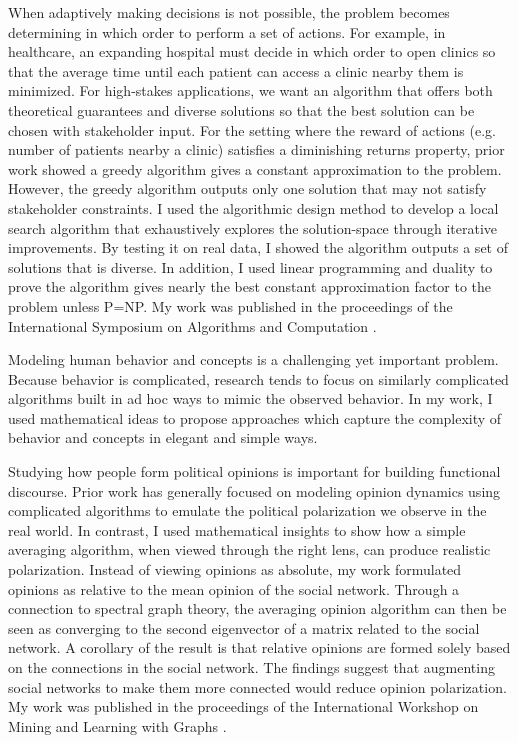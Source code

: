 \documentclass[11pt]{article}
\begin{document}
When adaptively making decisions is not possible, the problem becomes determining in which order to perform a set of actions.
For example, in healthcare, an expanding hospital must decide in which order to open clinics so that the average time until each patient can access a clinic nearby them is minimized.
For high-stakes applications, we want an algorithm that offers both theoretical guarantees and diverse solutions so that the best solution can be chosen with stakeholder input.
For the setting where the reward of actions (e.g. number of patients nearby a clinic) satisfies a diminishing returns property, prior work showed a greedy algorithm gives a constant approximation to the problem.
However, the greedy algorithm outputs only one solution that may not satisfy stakeholder constraints.
I used the algorithmic design method to develop a local search algorithm that exhaustively explores the solution-space through iterative improvements.
By testing it on real data, I showed the algorithm outputs a set of solutions that is diverse.
In addition, I used linear programming and duality to prove the algorithm gives nearly the best constant approximation factor to the problem unless P=NP.
My work was published in the proceedings of the International Symposium on Algorithms and Computation \cite{hellerstein2022local}.


\noindent Modeling human behavior and concepts is a challenging yet important problem.
Because behavior is complicated, research tends to focus on similarly complicated algorithms built in ad hoc ways to mimic the observed behavior.
In my work, I used mathematical ideas to propose approaches which capture the complexity of behavior and concepts in elegant and simple ways.

Studying how people form political opinions is important for building functional discourse.
Prior work has generally focused on modeling opinion dynamics using complicated algorithms to emulate the political polarization we observe in the real world.
In contrast, I used mathematical insights to show how a simple averaging algorithm, when viewed through the right lens, can produce realistic polarization.
Instead of viewing opinions as absolute, my work formulated opinions as relative to the mean opinion of the social network.
Through a connection to spectral graph theory, the averaging opinion algorithm can then be seen as converging to the second eigenvector of a matrix related to the social network.
A corollary of the result is that relative opinions are formed solely based on the connections in the social network.
The findings suggest that augmenting social networks to make them more connected would reduce opinion polarization.
My work was published in the proceedings of the International Workshop on Mining and Learning with Graphs \cite{musco2022quantify}.
\end{document}
